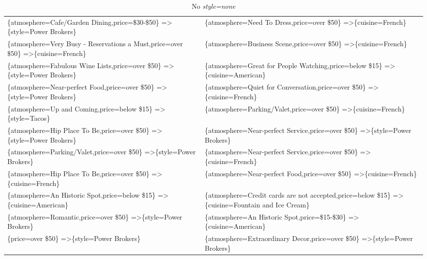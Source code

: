 \documentclass[letterpaper,10pt]{article}
\begin{document}
\begin{appendices}
\begin{table}[h]
\begin{adjustbox}{max width=\textwidth}
\begin{tabular}{ll}
\end{tabular}
\end{adjustbox}
\end{table}
\begin{table}[h]
\caption*{No \textit{style=none}}
\begin{adjustbox}{max width=\textwidth}
\begin{tabular}{ll}
\{atmosphere=Cafe/Garden Dining,price=\$30-\$50\} =\textgreater \{style=Power Brokers\} & \{atmosphere=Need To Dress,price=over \$50\} =\textgreater \{cuisine=French\} \\ 
\{atmosphere=Very Busy - Reservations a Must,price=over \$50\} =\textgreater \{cuisine=French\} & \{atmosphere=Business Scene,price=over \$50\} =\textgreater \{cuisine=French\} \\ 
\{atmosphere=Fabulous Wine Lists,price=over \$50\} =\textgreater \{style=Power Brokers\} & \{atmosphere=Great for People Watching,price=below \$15\} =\textgreater \{cuisine=American\} \\ 
\{atmosphere=Near-perfect Food,price=over \$50\} =\textgreater \{style=Power Brokers\} & \{atmosphere=Quiet for Conversation,price=over \$50\} =\textgreater \{cuisine=French\} \\ 
\{atmosphere=Up and Coming,price=below \$15\} =\textgreater \{style=Tacos\} & \{atmosphere=Parking/Valet,price=over \$50\} =\textgreater \{cuisine=French\} \\ 
\{atmosphere=Hip Place To Be,price=over \$50\} =\textgreater \{style=Power Brokers\} & \{atmosphere=Near-perfect Service,price=over \$50\} =\textgreater \{style=Power Brokers\} \\ 
\{atmosphere=Parking/Valet,price=over \$50\} =\textgreater \{style=Power Brokers\} & \{atmosphere=Near-perfect Service,price=over \$50\} =\textgreater \{cuisine=French\} \\ 
\{atmosphere=Hip Place To Be,price=over \$50\} =\textgreater \{cuisine=French\} & \{atmosphere=Near-perfect Food,price=over \$50\} =\textgreater \{cuisine=French\} \\ 
\{atmosphere=An Historic Spot,price=below \$15\} =\textgreater \{cuisine=American\} & \{atmosphere=Credit cards are not accepted,price=below \$15\} =\textgreater \{cuisine=Fountain and Ice Cream\} \\ 
\{atmosphere=Romantic,price=over \$50\} =\textgreater \{style=Power Brokers\} & \{atmosphere=An Historic Spot,price=\$15-\$30\} =\textgreater \{cuisine=American\} \\ 
\{price=over \$50\} =\textgreater \{style=Power Brokers\} & \{atmosphere=Extraordinary Decor,price=over \$50\} =\textgreater \{style=Power Brokers\} \\ 

\end{tabular}
\end{adjustbox}
\end{table}
\end{appendices}
\end{document}

